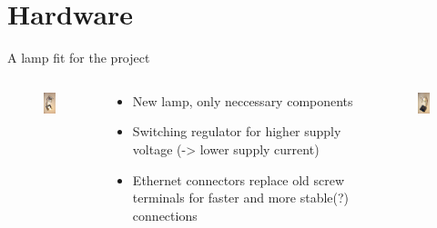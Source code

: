\documentclass{beamer}
\begin{document}
\section{Hardware}
  \begin{frame}{A lamp fit for the project}
    \begin{columns}
      \begin{column}{3.5cm}
        \begin{figure}
          \begin{center}
          \includegraphics[width=3cm]{bilder/lampe1.JPG}
          \end{center}
        \end{figure}
      \end{column}
      \begin{column}{5cm}
        \begin{itemize}
        \item New lamp, only neccessary components
        \item Switching regulator for higher supply voltage (-> lower supply current)
        \item Ethernet connectors replace old screw terminals for faster and more stable(?) connections
        \end{itemize}
      \end{column}
      \begin{column}{3.5cm}
         \begin{figure}
          \begin{center}
          \includegraphics[width=3cm]{bilder/lampe2.JPG}
          \end{center}
        \end{figure}
     \end{column}
    \end{columns}
  \end{frame}
\end{document}
